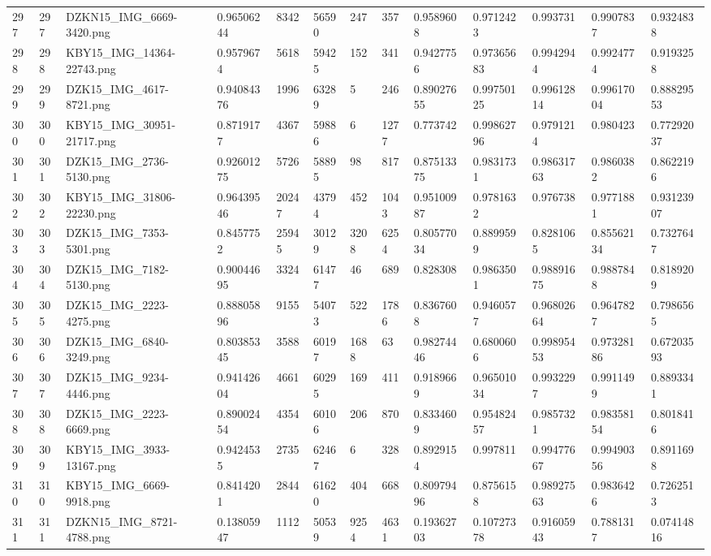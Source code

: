 \documentclass[11pt, a4paper, twoside]{report}
\begin{document}
\begin{longtable}[c]{@{}lllllllllllll@{}}
297 & 297 & DZKN15\_IMG\_6669-3420.png & 0.96506244 & 8342 & 56590 & 247 & 357 & 0.9589608 & 0.9712423 & 0.993731 & 0.9907837 & 0.9324838 \\
298 & 298 & KBY15\_IMG\_14364-22743.png & 0.9579674 & 5618 & 59425 & 152 & 341 & 0.9427756 & 0.97365683 & 0.9942944 & 0.9924774 & 0.9193258 \\
299 & 299 & DZK15\_IMG\_4617-8721.png & 0.94084376 & 1996 & 63289 & 5 & 246 & 0.89027655 & 0.99750125 & 0.99612814 & 0.99617004 & 0.88829553 \\
300 & 300 & KBY15\_IMG\_30951-21717.png & 0.8719177 & 4367 & 59886 & 6 & 1277 & 0.773742 & 0.99862796 & 0.9791214 & 0.980423 & 0.77292037 \\
301 & 301 & DZK15\_IMG\_2736-5130.png & 0.92601275 & 5726 & 58895 & 98 & 817 & 0.87513375 & 0.9831731 & 0.98631763 & 0.9860382 & 0.8622196 \\
302 & 302 & KBY15\_IMG\_31806-22230.png & 0.96439546 & 20247 & 43794 & 452 & 1043 & 0.95100987 & 0.9781632 & 0.976738 & 0.9771881 & 0.93123907 \\
303 & 303 & DZK15\_IMG\_7353-5301.png & 0.8457752 & 25945 & 30129 & 3208 & 6254 & 0.80577034 & 0.8899599 & 0.8281065 & 0.85562134 & 0.7327647 \\
304 & 304 & DZK15\_IMG\_7182-5130.png & 0.90044695 & 3324 & 61477 & 46 & 689 & 0.828308 & 0.9863501 & 0.98891675 & 0.9887848 & 0.8189209 \\
305 & 305 & DZK15\_IMG\_2223-4275.png & 0.88805896 & 9155 & 54073 & 522 & 1786 & 0.8367608 & 0.9460577 & 0.96802664 & 0.9647827 & 0.7986565 \\
306 & 306 & DZK15\_IMG\_6840-3249.png & 0.80385345 & 3588 & 60197 & 1688 & 63 & 0.98274446 & 0.6800606 & 0.99895453 & 0.97328186 & 0.67203593 \\
307 & 307 & DZK15\_IMG\_9234-4446.png & 0.94142604 & 4661 & 60295 & 169 & 411 & 0.9189669 & 0.96501034 & 0.9932297 & 0.9911499 & 0.8893341 \\
308 & 308 & DZK15\_IMG\_2223-6669.png & 0.89002454 & 4354 & 60106 & 206 & 870 & 0.8334609 & 0.95482457 & 0.9857321 & 0.98358154 & 0.8018416 \\
309 & 309 & KBY15\_IMG\_3933-13167.png & 0.9424535 & 2735 & 62467 & 6 & 328 & 0.8929154 & 0.997811 & 0.99477667 & 0.99490356 & 0.8911698 \\
310 & 310 & KBY15\_IMG\_6669-9918.png & 0.8414201 & 2844 & 61620 & 404 & 668 & 0.80979496 & 0.8756158 & 0.98927563 & 0.9836426 & 0.7262513 \\
311 & 311 & DZKN15\_IMG\_8721-4788.png & 0.13805947 & 1112 & 50539 & 9254 & 4631 & 0.19362703 & 0.10727378 & 0.91605943 & 0.7881317 & 0.07414816 \\

\end{longtable}
\end{document}
